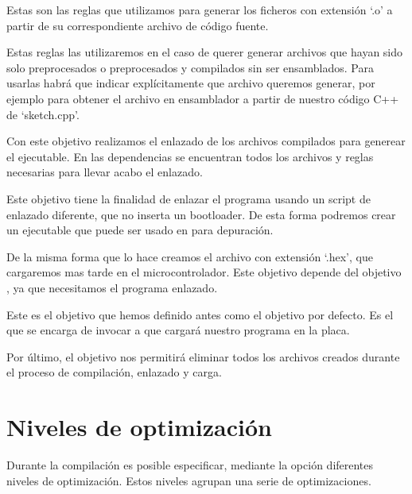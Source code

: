 
Estas son las reglas que utilizamos para generar los ficheros con extensión `.o' a partir de su correspondiente archivo de código fuente.


Estas reglas las utilizaremos en el caso de querer generar archivos que hayan sido solo preprocesados o preprocesados y compilados sin ser ensamblados. Para usarlas habrá que indicar explícitamente que archivo queremos generar, por ejemplo  para obtener el archivo en ensamblador a partir de nuestro código C++ de `sketch.cpp'.


Con este objetivo realizamos el enlazado de los archivos compilados para generear el ejecutable. En las dependencias se encuentran todos los archivos y reglas necesarias para llevar acabo el enlazado.


Este objetivo tiene la finalidad de enlazar el programa usando un script de enlazado diferente, que no inserta un bootloader. De esta forma podremos crear un ejecutable que puede ser usado en  para depuración.


De la misma forma que lo hace  creamos el archivo con extensión `.hex', que cargaremos mas tarde en el microcontrolador. Este objetivo depende del objetivo , ya que necesitamos el programa enlazado.


Este es el objetivo que hemos definido antes como el objetivo por defecto. Es el que se encarga de invocar a  que cargará nuestro programa en la placa.


Por último, el objetivo  nos permitirá eliminar todos los archivos creados durante el proceso de compilación, enlazado y carga.

\section{Niveles de optimización}
Durante la compilación es posible especificar, mediante la opción  diferentes niveles de optimización. Estos niveles agrupan una serie de optimizaciones.

